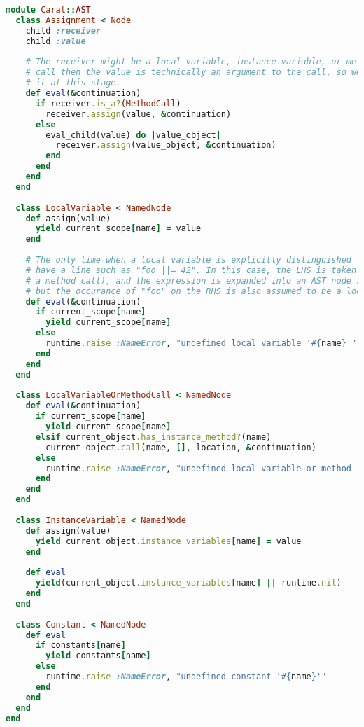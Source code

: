 \begin{lstlisting}[title={\small\Helvetica ast/variables.rb},language=Ruby]
module Carat::AST
  class Assignment < Node
    child :receiver
    child :value
    
    # The receiver might be a local variable, instance variable, or method call. If it is a method
    # call then the value is technically an argument to the call, so we don't want to evaluate
    # it at this stage.
    def eval(&continuation)
      if receiver.is_a?(MethodCall)
        receiver.assign(value, &continuation)
      else
        eval_child(value) do |value_object|
          receiver.assign(value_object, &continuation)
        end
      end
    end
  end
  
  class LocalVariable < NamedNode
    def assign(value)
      yield current_scope[name] = value
    end
    
    # The only time when a local variable is explicitly distinguished from a method call is when we
    # have a line such as "foo ||= 42". In this case, the LHS is taken to be a local variable (not
    # a method call), and the expression is expanded into an AST node representing "foo = foo || 42",
    # but the occurance of "foo" on the RHS is also assumed to be a local variable.
    def eval(&continuation)
      if current_scope[name]
        yield current_scope[name]
      else
        runtime.raise :NameError, "undefined local variable '#{name}'"
      end
    end
  end
  
  class LocalVariableOrMethodCall < NamedNode
    def eval(&continuation)
      if current_scope[name]
        yield current_scope[name]
      elsif current_object.has_instance_method?(name)
        current_object.call(name, [], location, &continuation)
      else
        runtime.raise :NameError, "undefined local variable or method '#{name}'"
      end
    end
  end
  
  class InstanceVariable < NamedNode
    def assign(value)
      yield current_object.instance_variables[name] = value
    end
    
    def eval
      yield(current_object.instance_variables[name] || runtime.nil)
    end
  end
  
  class Constant < NamedNode
    def eval
      if constants[name]
        yield constants[name]
      else
        runtime.raise :NameError, "undefined constant '#{name}'"
      end
    end
  end
end

\end{lstlisting}
